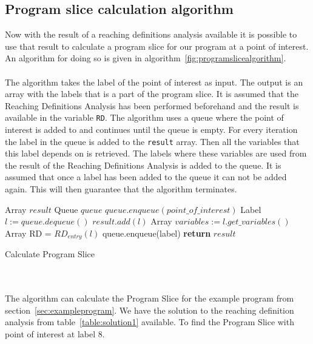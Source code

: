 \subsection{Program slice calculation algorithm}
Now with the result of a reaching definitions analysis available it is possible to use that result to calculate a program slice for our program at a point of interest. An algorithm for doing so is given in algorithm~\ref{fig:programslicealgorithm}.
\\
\\
The algorithm takes the label of the point of interest as input. The output is an array with the labels that is a part of the program slice. It is assumed that the Reaching Definitions Analysis has been performed beforehand and the result is available in the variable \texttt{RD}. The algorithm uses a queue where the point of interest is added to and continues until the queue is empty. For every iteration the label in the queue is added to the \texttt{result} array. Then all the variables that this label depends on is retrieved. The labels where these variables are used from the result of the Reaching Definitions Analysis is added to the queue. It is assumed that once a label has been added to the queue it can not be added again. This will then guarantee that the algorithm terminates.
\begin{algorithm}
 \begin{algorithmic}[1]
 \State Array $result$
 \State Queue $queue$
 \State $queue.enqueue(point\_of\_interest)$
 \State Label $l:=queue.dequeue()$
 \State $result.add(l)$
 \State Array $variables:=l.get\_variables()$
 \State Array RD = $RD_{entry}(l)$
\State queue.enqueue(label)
\EndIf 
\EndFor
 \EndWhile
 \State \textbf{return} $result$
 \EndProcedure
 \end{algorithmic}
 \caption{Calculate Program Slice}
 \label{fig:programslicealgorithm}
\end{algorithm}
\\\\
The algorithm can calculate the Program Slice for the example program from section~\ref{sec:exampleprogram}. We have the solution to the reaching definition analysis from table~\ref{table:solution1} available. To find the Program Slice with point of interest at label 8.
